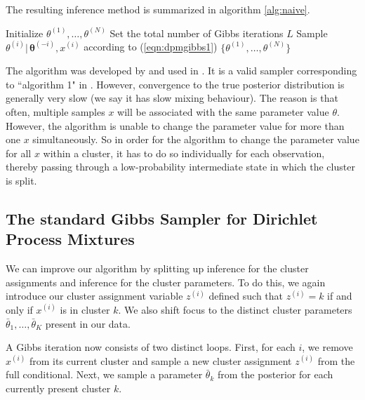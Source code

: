 \documentclass[final,3p,times,twocolumn]{elsarticle}
\let\bs\boldsymbol
\begin{document}
The resulting inference method is summarized in algorithm \ref{alg:naive}.
\begin{algorithm}
\caption{Na{\"i}ve Gibbs sampler for DP mixtures}
\label{alg:naive}
\begin{algorithmic}[1]
\State Initialize $\theta^{(1)},\dots,\theta^{(N)}$
\State Set the total number of Gibbs iterations $L$
\State Sample $\theta^{(i)}|\,\bs\theta^{(-i)},x^{(i)}$ according to (\ref{eqn:dpmgibbs1})
\EndFor
\EndFor
\State\Return $\{\theta^{(1)},\dots,\theta^{(N)}\}$
\end{algorithmic}
\end{algorithm}

The algorithm was developed by \cite{escobar1994} and used in \cite{escobar1995}.
It is a valid sampler corresponding to ``algorithm 1" in \cite{neal2000}.
However, convergence to the true posterior distribution is generally very slow (we say it has slow mixing behaviour).
The reason is that often, multiple samples $x$ will be associated with the same parameter value $\theta$.
However, the algorithm is unable to change the parameter value for more than one $x$ simultaneously. 
So in order for the algorithm to change the parameter value for all $x$ within a cluster, it has to do so individually for each observation, thereby passing through a low-probability intermediate state in which the cluster is split.

\subsection{The standard Gibbs Sampler for Dirichlet Process Mixtures}
We can improve our algorithm by splitting up inference for the cluster assignments and inference for the cluster parameters.
To do this, we again introduce our cluster assignment variable $z^{(i)}$ defined such that $z^{(i)}=k$ if and only if $x^{(i)}$ is in cluster $k$.
We also shift focus to the distinct cluster parameters $\bar \theta_1,\dots,\bar \theta_K$ present in our data. 

A Gibbs iteration now consists of two distinct loops.
First, for each $i$, we remove $x^{(i)}$ from its current cluster and sample a new cluster assignment $z^{(i)}$ from the full conditional.
Next, we sample a parameter $\bar \theta_k$ from the posterior for each currently present cluster $k$.
\end{document}
